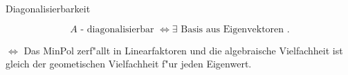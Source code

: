 \documentclass[class=article, crop=false]{standalone}
\begin{document}
\begin{zettel}{Diagonalisierbarkeit}
\begin{flashcard}[]{}
	\begin{definition}[diagonalisierbar]
		\[
			A \text{ - diagonalisierbar } \iff \exists \text{ Basis aus Eigenvektoren }
		.\]
	\end{definition}
\end{flashcard}

$\iff$  Das MinPol zerf"allt in Linearfaktoren und die algebraische Vielfachheit ist gleich der geometischen Vielfachheit f"ur jeden Eigenwert.

\end{zettel}
\end{document}
